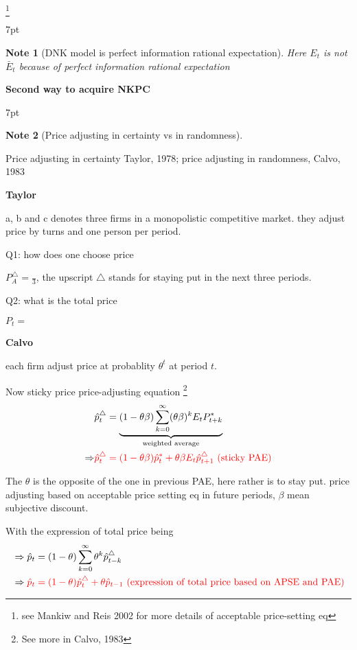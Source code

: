 \documentclass{article}
\newenvironment{blueblock}{
\def\FrameCommand{
  \hspace{1pt}
    {\color{DarkBlue}
    \vrule width 2pt}
    {\color{blueshade}
    \vrule width 4pt}
  \colorbox{blueshade}
}
\MakeFramed{
  \advance
  \hsize-
  \width
  \FrameRestore}
\noindent\hspace{-4.55pt}%
\begin{adjustwidth}{}{7pt}
\vspace{2pt}\vspace{2pt}
}
{\vspace{2pt}\end{adjustwidth}\endMakeFramed}
\newtheorem{note}{Note}
\begin{document}
\footnote{see Mankiw and Reis 2002 for more details of acceptable price-setting eq}

\begin{blueblock}
\begin{note}[DNK model is perfect information rational expectation]
Here $E_t$ is not $\bar E_t$ because of perfect information rational expectation
\end{note}
\end{blueblock}


\textbf{Second way to acquire NKPC}

\begin{blueblock}
\begin{note}[Price adjusting in certainty vs in randomness]
\end{note}
Price adjusting in certainty Taylor, 1978; price adjusting in randomness, Calvo, 1983

\textbf{Taylor}

a, b and c denotes three firms in a monopolistic competitive market. they adjust price by turns and one person per period.

Q1: how does one choose price

$P_A^\triangle=\frac{}{3}$, the upscript $\triangle$ stands for staying put in the next three periods.

Q2: what is the total price

$P_t=$

\textbf{Calvo}

each firm adjust price at probablity $\theta^t$ at period $t$.

\end{blueblock}

Now sticky price price-adjusting equation \footnote{See more in Calvo, 1983}
\begin{align}
&\hat p_t^\triangle=\underbrace{(1-\theta \beta)\sum\limits_{k=0}^\infty (\theta \beta)^k E_t P_{t+k}^*}_{\text{weighted average}}
\\\Rightarrow &\color{red} \hat p_t^\triangle=(1-\theta \beta) \hat p_t^* +\theta \beta E_t \hat p_{t+1}^\triangle \text{ (sticky PAE)}
\end{align}

The $\theta$ is the opposite of the one in previous PAE, here rather is to stay put. price adjusting based on acceptable price setting eq in future periods, $\beta$ mean subjective discount.

With the expression of total price being
\begin{align}
&\Rightarrow\hat p_t=(1-\theta) \sum\limits_{k=0}^\infty \theta^k \hat p_{t-k}^\triangle
\\&\Rightarrow \color{red} \hat p_t=(1-\theta)\hat p_t^\triangle +\theta \hat p_{t-1} \text{ (expression of total price based on APSE and PAE)}
\end{align}
\end{document}
